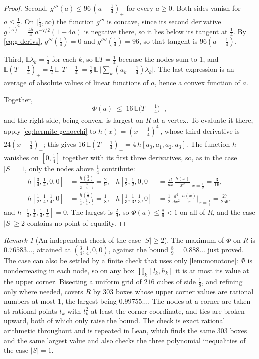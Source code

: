 \documentclass[11pt,reqno]{amsart}
\renewcommand{\_}{\origunderscore\allowbreak}
\numberwithin{equation}{section}
\theoremstyle{plain}
\theoremstyle{definition}
\theoremstyle{remark}
\newtheorem{remark}[thm]{Remark}
\begin{document}
\begin{proof}
Second, $g'''(a)\le96\,(a-\tfrac14)_+$ for every $a\ge0$. Both sides vanish
for $a\le\frac14$. On $[\frac14,\infty)$ the function $g'''$ is concave,
since its second derivative $g^{(5)}=\frac{45}{4}\,a^{-7/2}(1-4a)$ is
negative there, so it lies below its tangent at $\frac14$. By
\cref{eq:g-derivs}, $g'''(\frac14)=0$ and $g''''(\frac14)=96$, so that
tangent is $96(a-\frac14)$.

Third, $\mathbb{E}\lambda_k=\frac14$ for each $k$, so $\mathbb{E}T=\frac14$
because the nodes sum to $1$, and
$\mathbb{E}(T-\frac14)_+=\frac12\,\mathbb{E}\,\bigl|T-\tfrac14\bigr|
=\frac12\,\mathbb{E}\,\bigl|\sum_k(a_k-\tfrac14)\lambda_k\bigr|$. The
last expression is an average of absolute values of linear functions of
$a$, hence a convex function of $a$.

Together,
\[
  \Phi(a)\;\le\;16\,\mathbb{E}\bigl(T-\tfrac14\bigr)_+ ,
\]
and the right side, being convex, is largest on $R$ at a vertex. To evaluate
it there, apply \cref{eq:hermite-genocchi} to $h(x)=(x-\frac14)_+^4$, whose
third derivative is $24(x-\frac14)_+$; this gives
$16\,\mathbb{E}(T-\frac14)_+=4\,h[a_0,a_1,a_2,a_3]$. The function $h$
vanishes on $[0,\frac14]$ together with its first three derivatives, so, as
in the case $|S|=1$, only the nodes above $\frac14$ contribute:
\[
\begin{aligned}
  h[\tfrac34,\tfrac14,0,0]&=\frac{h(\frac34)}{\frac12\cdot\frac34\cdot\frac34}=\frac29,&
  h[\tfrac12,\tfrac12,0,0]&=\frac{d}{dx}\,\frac{h(x)}{x^2}\Big|_{x=\frac12}=\frac3{16},\\
  h[\tfrac12,\tfrac14,\tfrac14,0]&=\frac{h(\frac12)}{\frac14\cdot\frac14\cdot\frac12}=\frac18,&
  h[\tfrac13,\tfrac13,\tfrac13,0]&=\frac12\,\frac{d^2}{dx^2}\,\frac{h(x)}{x}\Big|_{x=\frac13}=\frac{27}{256},
\end{aligned}
\]
and $h[\frac14,\frac14,\frac14,\frac14]=0$. The largest is $\frac29$, so
$\Phi(a)\le\frac89<1$ on all of $R$, and the case $|S|\ge2$ contains no
point of equality.
\end{proof}

\begin{remark}[An independent check of the case $|S|\ge2$]\label{rem:cap-boxes}
The maximum of $\Phi$ on $R$ is $0.76583\ldots$, attained at
$(\frac34,\frac14,0,0)$, against the bound $\frac89=0.888\ldots$ just
proved. The case can also be settled by a finite check that uses only
\cref{lem:monotone}: $\Phi$ is nondecreasing in each node, so on any box
$\prod_k[l_k,h_k]$ it is at most its value at the upper corner. Bisecting a
uniform grid of $216$ cubes of side $\frac18$, and refining only where
needed, covers $R$ by $303$ boxes whose upper corner values are rational
numbers at most $1$, the largest being $0.99755\ldots$. The nodes at a
corner are taken at rational points $t_k$ with $t_k^2$ at least the corner
coordinate, and ties are broken upward, both of which only raise the bound.
The check is exact rational arithmetic throughout and is repeated in Lean,
which finds the same $303$ boxes and the same largest value and also checks
the three polynomial inequalities of the case $|S|=1$.
\end{remark}
\end{document}
